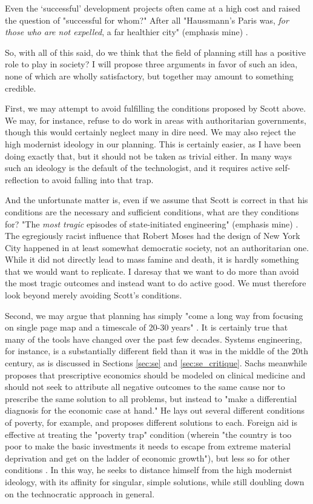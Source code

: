 Even the `successful' development projects often came at a high cost and raised the question of "successful for whom?" After all "Haussmann's Paris was, \textit{for those who are not expelled}, a far healthier city" (emphasis mine) \cite{scottSeeingStateHow2020}.

So, with all of this said, do we think that the field of planning still has a positive role to play in society? I will propose three arguments in favor of such an idea, none of which are wholly satisfactory, but together may amount to something credible.

First, we may attempt to avoid fulfilling the conditions proposed by Scott above. We may, for instance, refuse to do work in areas with authoritarian governments, though this would certainly neglect many in dire need. We may also reject the high modernist ideology in our planning. This is certainly easier, as I have been doing exactly that, but it should not be taken as trivial either. In many ways such an ideology is the default of the technologist, and it requires active self-reflection to avoid falling into that trap. 

And the unfortunate matter is, even if we assume that Scott is correct in that his conditions are the necessary and sufficient conditions, what are they conditions for? "The \textit{most tragic} episodes of state-initiated engineering" (emphasis mine) \cite{scottSeeingStateHow2020}. The egregiously racist influence that Robert Moses had the design of New York City \cite{winnerArtifactsHavePolitics1980} happened in at least somewhat democratic society, not an authoritarian one. While it did not directly lead to mass famine and death, it is hardly something that we would want to replicate. I daresay that we want to do more than avoid the most tragic outcomes and instead want to do active good. We must therefore look beyond merely avoiding Scott's conditions.

Second, we may argue that planning has simply "come a long way from focusing on single page map and a timescale of 20-30 years" \cite{robinsonSectionPlanFormulation1972}. It is certainly true that many of the tools have changed over the past few decades. Systems engineering, for instance, is a substantially different field than it was in the middle of the 20th century, as is discussed in Sections \ref{sec:se} and \ref{sec:se_critique}. Sachs meanwhile proposes that prescriptive economics should be modeled on clinical medicine and should not seek to attribute all negative outcomes to the same cause nor to prescribe the same solution to all problems, but instead to "make a differential diagnosis for the economic case at hand." He lays out several different conditions of poverty, for example, and proposes different solutions to each. Foreign aid is effective at treating the "poverty trap" condition (wherein "the country is too poor to make the basic investments it needs to escape from extreme material deprivation and get on the ladder of economic growth"), but less so for other conditions \cite{sachsAgeSustainableDevelopment2015}. In this way, he seeks to distance himself from the high modernist ideology, with its affinity for singular, simple solutions, while still doubling down on the technocratic approach in general. 

